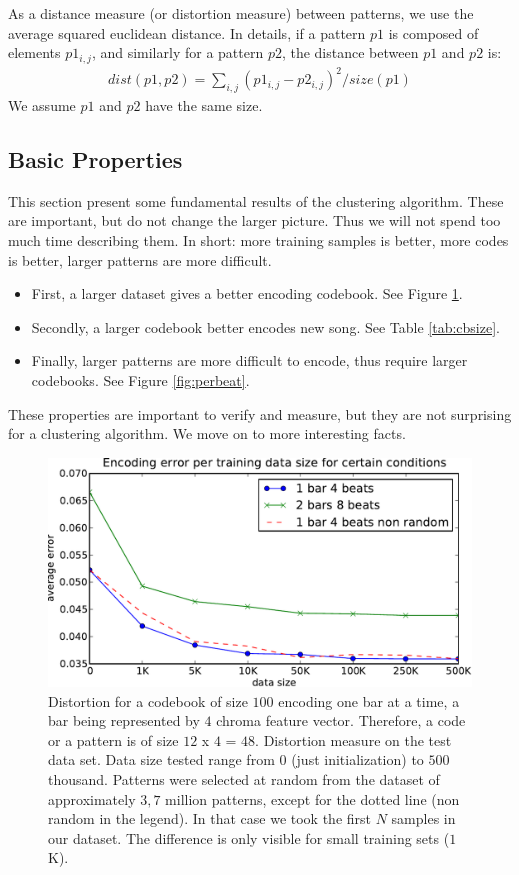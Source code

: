 \documentclass{article}
\begin{document}
As a distance measure (or distortion measure) between patterns, we use
the average squared euclidean distance. In details, if a pattern $p1$
is composed of elements $p1_{i,j}$, and similarly for a pattern $p2$,
the distance between $p1$ and $p2$ is:
\begin{eqnarray}
  dist(p1,p2) = \sum_{i,j} (p1_{i,j} - p2_{i,j})^2 / size(p1)  \label{eq:dist}
\end{eqnarray}
We assume $p1$ and $p2$ have the same size.


\subsection{Basic Properties}
This section present some fundamental results of the clustering algorithm.
These are important, but do not change the larger picture. Thus we will not
spend too much time describing them. In short: more training samples is
better, more codes is better, larger patterns are more difficult.
\begin{itemize}
\item First, a larger dataset gives a better encoding codebook. See Figure
\ref{fig:data_sizes}.
\item Secondly, a larger codebook better encodes new song. See 
Table \ref{tab:cbsize}.
\item Finally, larger patterns are more difficult to encode, thus require
larger codebooks. See Figure \ref{fig:perbeat}.
\end{itemize}

These properties are important to verify and measure, but they are not
surprising for a clustering algorithm. We move on to more interesting facts.

\begin{figure}[htb]
\begin{center}
\includegraphics[width=.99\columnwidth]{data_sizes}
\end{center}
\caption{\small{Distortion for a codebook of size $100$ encoding one bar
at a time, a bar being represented by $4$ chroma feature vector.
Therefore, a code or a pattern is of size $12$ x $4$ = $48$.
Distortion measure on the test data set. Data size tested range
from $0$ (just initialization) to $500$ thousand. Patterns were selected at
random from the dataset of approximately $3,7$ million patterns, except
for the dotted line (non random in the legend). In that case we took the
first $N$ samples in our dataset. The difference is only visible for small
training sets ($1$K).
}}
\label{fig:data_sizes}
\end{figure}
\end{document}
